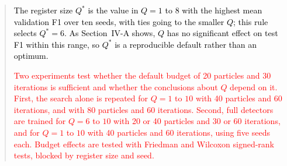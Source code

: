 \documentclass[11pt]{article}
\newenvironment{excerpt}{\begin{quote}\sloppy}{\end{quote}}
\begin{document}
\begin{excerpt}
\textcolor{black}{The register size $Q^{*}$ is the value in
$Q=1$ to $8$ with the highest mean validation F1 over ten seeds, with
ties going to the smaller $Q$; this rule selects $Q^{*}=6$. As Section~IV-A
shows, $Q$ has no significant effect on test F1 within this range, so $Q^{*}$ is a
reproducible default rather than an optimum.}

\textcolor{red}{Two experiments test whether the default
budget of 20 particles and 30 iterations is sufficient and whether
the conclusions about $Q$ depend on it. First, the search alone is
repeated for $Q=1$ to $10$ with 40 particles and 60 iterations, and
with 80 particles and 60 iterations. Second, full detectors are
trained for $Q=6$ to $10$ with 20 or 40 particles and 30 or 60
iterations, and for $Q=1$ to $10$ with 40 particles and 60
iterations, using five seeds each. Budget effects are tested with
Friedman and Wilcoxon signed-rank tests, blocked by register size
and seed.}
\end{excerpt}
\end{document}
